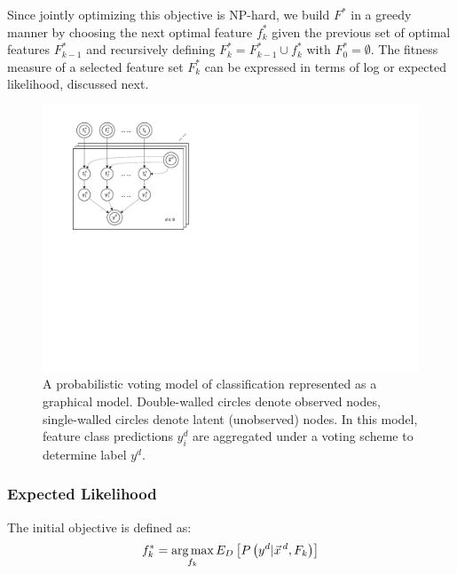 Since jointly optimizing this objective is NP-hard, we build
$F^*$ in a greedy manner by choosing the next optimal feature $f^*_k$
given the previous set of optimal features $F^*_{k-1}$ and recursively
defining $F^*_k = F^*_{k-1}\cup f^*_k$ with $F^*_0 = \emptyset$. The
fitness measure of a selected feature set $F^*_k$ can be
expressed in terms of log or expected likelihood, discussed next.

\begin{figure}[tbp!]
	\centering
	\includegraphics[scale=0.9]{Plots_1.pdf}
	\caption{\footnotesize A probabilistic voting model of classification represented as a graphical model. 
Double-walled circles denote observed nodes, single-walled circles denote latent (unobserved) nodes.
In this model, feature class predictions $y_i^d$ are aggregated under a voting scheme to determine 
label $y^d$.}
	\label{fig:model}
\end{figure}


\COMMENT
\subsubsection{Expected Likelihood}
The initial objective is defined as:
\[f_k^*=\argmax_{f_k}E_D\left[P\left(y^d|\vec{x}^{\,d},F_k\right)\right]\]


